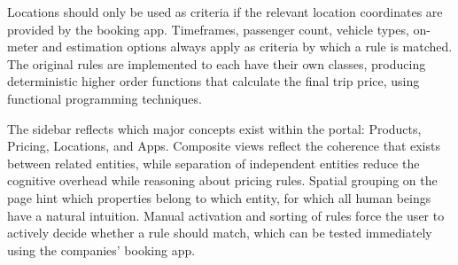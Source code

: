 Locations should only be used as criteria if the relevant location coordinates are provided by the booking app. Timeframes, passenger count, vehicle types, on-meter and estimation options always apply as criteria by which a rule is matched. The original rules are implemented to each have their own classes, producing deterministic higher order functions that calculate the final trip price, using functional programming techniques.

The sidebar reflects which major concepts exist within the portal: Products, Pricing, Locations, and Apps. Composite views reflect the coherence that exists between related entities, while separation of independent entities reduce the cognitive overhead while reasoning about pricing rules. Spatial grouping on the page hint which properties belong to which entity, for which all human beings have a natural intuition. Manual activation and sorting of rules force the user to actively decide whether a rule should match, which can be tested immediately using the companies' booking app.
